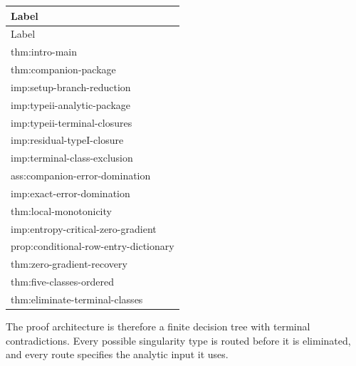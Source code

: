 \documentclass[11pt]{amsart}
\begin{document}
\begin{longtable}{@{}>{\ttfamily\footnotesize\raggedright\arraybackslash}p{}@{}}
\toprule
Label\\
\midrule
\endfirsthead
\toprule
Label\\
\midrule
\endhead
thm:intro-main\\
thm:companion-package\\
imp:setup-branch-reduction\\
imp:typeii-analytic-package\\
imp:typeii-terminal-closures\\
imp:residual-typeI-closure\\
imp:terminal-class-exclusion\\
ass:companion-error-domination\\
imp:exact-error-domination\\
thm:local-monotonicity\\
imp:entropy-critical-zero-gradient\\
prop:conditional-row-entry-dictionary\\
thm:zero-gradient-recovery\\
thm:five-classes-ordered\\
thm:eliminate-terminal-classes\\
\bottomrule
\end{longtable}


The proof architecture is therefore a finite decision tree with terminal contradictions.  Every possible singularity type is routed before it is eliminated, and every route specifies the analytic input it uses.
\end{document}
